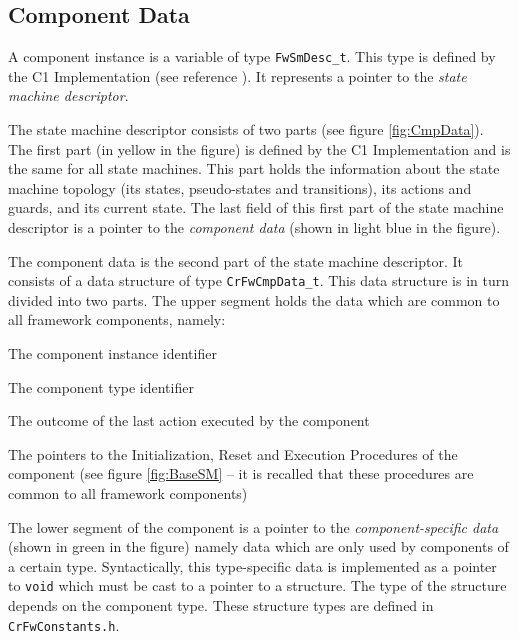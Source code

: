 \documentclass[a4paper,10pt]{article}
\newenvironment{fw_itemize}						%
{\begin{itemize}
  \setlength{\itemsep}{1mm}
  \setlength{\parskip}{0pt}
  \setlength{\parsep}{0pt}}
{\end{itemize}}
\begin{document}
\subsection{Component Data}\label{sec:CmpData}
 
A component instance is a variable of type \texttt{FwSmDesc\_t}. This type is defined by the C1 Implementation (see reference \cite{ref:C1Implementation}). It represents a pointer to the \textit{state machine descriptor}.

The state machine descriptor consists of two parts (see figure \ref{fig:CmpData}). The first part (in yellow in the figure) is defined by the C1 Implementation and is the same for all state machines. This part holds the information about the state machine topology (its states, pseudo-states and transitions), its actions and guards, and its current state. The last field of this first part of the state machine descriptor is a pointer to the \textit{component data} (shown in light blue in the figure). 

The component data is the second part of the state machine descriptor. It consists of a data structure of type \texttt{CrFwCmpData\_t}. This data structure is in turn divided into two parts. The upper segment holds the data which are common to all framework components, namely:

\begin{fw_itemize}
\item The component instance identifier
\item The component type identifier
\item The outcome of the last action executed by the component
\item The pointers to the Initialization, Reset and Execution Procedures of the component (see figure \ref{fig:BaseSM} -- it is recalled that these procedures are common to all framework components)
\end{fw_itemize}

The lower segment of the component is a pointer to the \textit{component-specific data} (shown in green in the figure) namely data which are only used by components of a certain type. Syntactically, this type-specific data is implemented as a pointer to \texttt{void} which must be cast to a pointer to a structure. The type of the structure depends on the component type. These structure types are defined in \texttt{CrFwConstants.h}.
\end{document}
